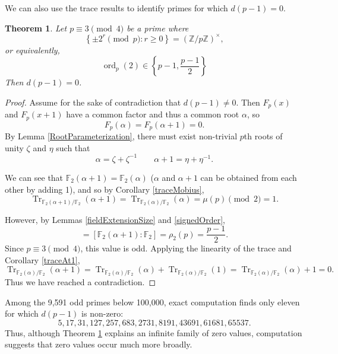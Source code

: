 \documentclass[a4paper]{article}
\newtheorem{theorem}{Theorem}[section]
\newcommand{\F}{\mathbb{F}}
\newcommand{\Z}{\mathbb{Z}}
\newcommand{\ord}[2][]{\operatorname{ord}_{#1}\!\left( #2 \right)}
\newcommand{\Tr}[2][]{\operatorname{Tr}_{#1}\!\left( #2 \right)}
\begin{document}
	We can also use the trace results to identify primes for which $d(p-1) = 0$.
	\begin{theorem}\label{dp-1isZero}
		Let $p \equiv 3 \pmod 4$ be a prime where
		\begin{equation*}
			\left\{\pm 2^r \pmod p : r \geq 0\right\} = (\Z / p \Z)^{\times},
		\end{equation*}
		or equivalently,
		\begin{equation*}
			\ord[p]{2} \in \left\{p-1, \frac{p-1}{2}\right\}
		\end{equation*}
		Then $d(p - 1) = 0$.
	\end{theorem}
	\begin{proof}
		Assume for the sake of contradiction that $d(p-1) \neq 0$.
		Then $F_{p}(x)$ and $F_{p}(x+1)$ have a common factor and thus a common root $\alpha$, so
		\begin{equation*}
			F_{p}(\alpha) = F_{p}(\alpha+1) = 0.
		\end{equation*}
		By Lemma \ref{RootParameterization}, there must exist non-trivial $p$th roots of unity $\zeta$ and $\eta$ such that
		\begin{equation*}
			\alpha = \zeta + \zeta^{-1} \qquad \alpha+1 = \eta + \eta^{-1}.
		\end{equation*}
	
		We can see that $\F_2(\alpha+1) = \F_2(\alpha)$ ($\alpha$ and $\alpha+1$ can be obtained from each other by adding 1), and so by Corollary \ref{traceMobius}, 
		\begin{equation*}
			\Tr[\F_2(\alpha+1) / \F_2]{\alpha+1} = \Tr[\F_2(\alpha) / \F_2]{\alpha} = \mu(p) \pmod 2 = 1.
		\end{equation*}
	
		However, by Lemmas \ref{fieldExtensionSize} and \ref{signedOrder},
		\begin{equation*}
			[\F_2(\alpha) : \F_2] = [\F_2(\alpha+1) : \F_2] = \rho_2(p) = \frac{p-1}{2}.
		\end{equation*}
		Since $p \equiv 3 \pmod 4$, this value is odd.
		Applying the linearity of the trace and Corollary \ref{traceAt1},
		\begin{equation*}
			\Tr[\F_2(\alpha) / \F_2]{\alpha+1} = \Tr[\F_2(\alpha) / \F_2]{\alpha} + \Tr[\F_2(\alpha) / \F_2]{1} = \Tr[\F_2(\alpha) / \F_2]{\alpha} + 1 = 0.
		\end{equation*}
		Thus we have reached a contradiction.
	\end{proof}

	Among the 9,591 odd primes below 100,000, exact computation finds only eleven for which $d(p-1)$ is non-zero:
	\begin{equation*}
		5, 17, 31, 127, 257, 683, 2731, 8191, 43691, 61681, 65537.
	\end{equation*}
	Thus, although Theorem \ref{dp-1isZero} explains an infinite family of zero values, computation suggests that zero values occur much more broadly.
	
\end{document}

